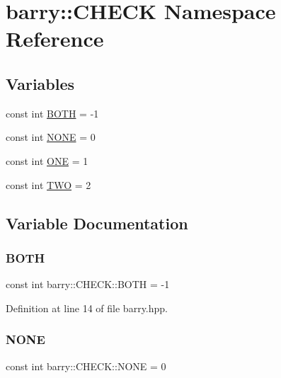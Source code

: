 \hypertarget{namespacebarry_1_1_c_h_e_c_k}{}\section{barry\+:\+:C\+H\+E\+CK Namespace Reference}
\label{namespacebarry_1_1_c_h_e_c_k}
\subsection*{Variables}
\begin{DoxyCompactItemize}
\item 
const int \hyperlink{namespacebarry_1_1_c_h_e_c_k_a604b0ef801ff768bd8561362cef579b2}{B\+O\+TH} = -\/1
\item 
const int \hyperlink{namespacebarry_1_1_c_h_e_c_k_aa64c84acf4e28b6cb1243ccda1eec41c}{N\+O\+NE} = 0
\item 
const int \hyperlink{namespacebarry_1_1_c_h_e_c_k_add50baad3a196b1979efbbf9e6c86913}{O\+NE} = 1
\item 
const int \hyperlink{namespacebarry_1_1_c_h_e_c_k_a6aa56c3d8a8260d90867278d21ace4d2}{T\+WO} = 2
\end{DoxyCompactItemize}


\subsection{Variable Documentation}
\mbox{\label{namespacebarry_1_1_c_h_e_c_k_a604b0ef801ff768bd8561362cef579b2}} 
\subsubsection{\texorpdfstring{B\+O\+TH}{BOTH}}
{\footnotesize\ttfamily const int barry\+::\+C\+H\+E\+C\+K\+::\+B\+O\+TH = -\/1}



Definition at line 14 of file barry.\+hpp.

\mbox{\label{namespacebarry_1_1_c_h_e_c_k_aa64c84acf4e28b6cb1243ccda1eec41c}} 
\subsubsection{\texorpdfstring{N\+O\+NE}{NONE}}
{\footnotesize\ttfamily const int barry\+::\+C\+H\+E\+C\+K\+::\+N\+O\+NE = 0}



